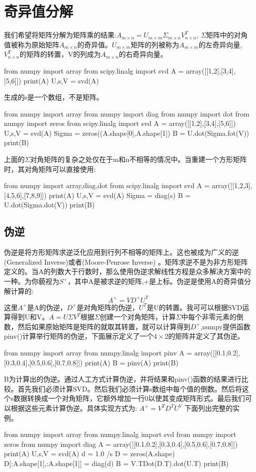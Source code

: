 \section{奇异值分解}
我们希望将矩阵分解为矩阵乘的结果:$A_{m\times n}=U_{m\times m}\Sigma_{m\times n} V_{n\times n}^T$,
$\Sigma$矩阵中的对角值被称为原始矩阵$A_{m\times n}$的奇异值。$U_{m\times m}$矩阵的列被称为$A_{m\times m}$的左奇异向量,$V^T_{n\times n}$的矩阵的转置，V的列成为$A_{m\times n}$的右奇异向量。
\begin{python}
from numpy import array
from scipy.linalg import svd
A = array([[1,2],[3,4],[5,6]])
print(A)
U,s,V = svd(A)
\end{python}
生成的s是一个数组，不是矩阵。
\begin{python}
from numpy import array
from numpy import diag
from numpy import dot
from numpy import zeros
from scipy.linalg import svd
A = array([[1,2],[3,4],[5,6]])
U,s,V = svd(A)
Sigma = zeros((A.shape[0],A.shape[1])
B = U.dot(Sigma.fot(V))
print(B)
\end{python}
上面的$\Sigma$对角矩阵的复杂之处仅在于m和n不相等的情况中。当重建一个方形矩阵时，其对角矩阵可以直接使用:
\begin{python}
from numpy import array,diag,dot
from scipy.linalg import svd
A = array([[1,2,3],[4,5,6],[7,8,9]])
print(A)
U,s,V = svd(A)
Sigma = diag(s)
B = U.dot(Sigma.dot(V))
print(B)
\end{python}
\subsection{伪逆}
伪逆是将方形矩阵求逆泛化应用到行列不相等的矩阵上。这也被成为广义的逆(Generalized Inverse)或者(Moore-Penrose Inverse)
。矩阵求逆不是为非方形矩阵定义的。当A的列数大于行数时，那么使用伪逆求解线性方程是众多解决方案中的一种。为你藐视为$S^{+}$，其中A是被求逆的矩阵,+是上标。伪逆是使用A的奇异值分解计算的:
\[A^{+}=VD^+U^T\]这里$A^{+}$是A的伪逆，$D^+$是对角矩阵的伪逆，$U^T$是U的转置。我可可以根据SVD运算得到U和V。$A=U\Sigma V^T$根据$\Sigma$创建一个对角矩阵，计算$\Sigma$中每个非零元素的倒数，然后如果原始矩阵是矩阵的就取其转置，就可以计算得到$D^+$,numpy提供函数pinv()计算举行矩阵的伪逆，下面展示定义了一个$4\times2$的矩阵并定义了其伪逆。
\begin{python}
from numpy import array
from numpy.linalg import pinv
A = array([[0.1,0.2],[0.3,0.4],[0.5,0.6],[0.7,0.8]])
print(A)
B = pinv(A)
print(B)
\end{python}
B为计算出的伪逆。通过人工方式计算伪逆，并将结果和pinv()函数的结果进行比较。首先我们必须计算SVD。然后我们必须计算s数组中每个值的倒数。然后将这个s数据转换成一个对角矩阵，它额外增加一行0以使其变成矩阵形式。最后我们可以根据这些元素计算伪逆。具体实现方式为:
$A^+=V^TD^TU^V$
下面列出完整的实例。
\begin{python}
from numpy import array
from numpy.linalg import svd
from numpy import zeros
from numpy import diag
A = array([[0.1,0.2],[0.3,0.4],[0.5,0.6],[0.7,0.8]])
print(A)
U,s,V = svd(A)
d = 1.0 /s
D = zeros(A.shape)
D[:A.shape[1],:A.shape[1]] = diag(d)
B = V.TDot(D.T).dot(U.T)
print(B)
\end{python}

